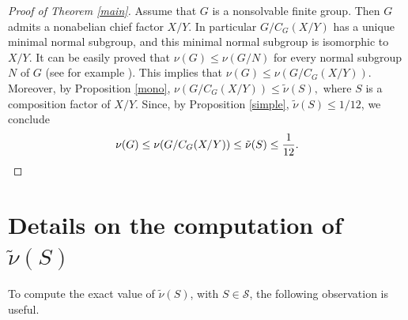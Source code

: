 \documentclass{amsart}
\numberwithin{equation}{section}
\begin{document}
\begin{proof}[Proof of Theorem \ref{main}]
Assume that $G$ is a nonsolvable finite group. Then $G$ admits a nonabelian chief factor $X/Y$. In particular $G/C_G(X/Y)$ has a unique minimal normal subgroup, and this minimal normal subgroup is isomorphic to $X/Y.$ It can be easily proved that $\nu(G)\leq \nu(G/N)$ for every normal subgroup $N$ of $G$ (see for example \cite[Lemma 2.1]{cgk}). This implies that $\nu(G)\leq \nu(G/C_G(X/Y)).$ Moreover, by Proposition \ref{mono}, $\nu(G/C_G(X/Y))\leq \tilde\nu(S),$ where $S$ is a composition factor of $X/Y.$ Since, by Proposition \ref{simple}, $\tilde \nu(S)\leq 1/12$, we conclude
$$\nu(G)\leq \nu(G/C_G(X/Y))\leq \tilde \nu(S)\leq \frac{1}{12}.\qedhere
$$
\end{proof}
\section{Details on the computation of $\tilde \nu(S)$}

To compute the exact value of $\tilde{\nu}(S)$, with $S \in \mathcal{S}$, the following observation is useful.
\end{document}
